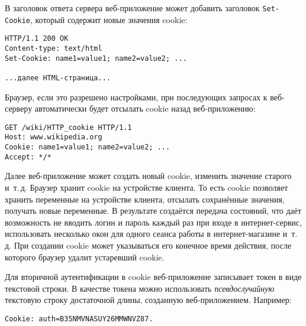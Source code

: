 В заголовок ответа сервера веб-приложение может добавить заголовок \texttt{Set-Cookie}, который содержит новые значения cookie:
\begin{center} \begin{verbatim}
HTTP/1.1 200 OK
Content-type: text/html
Set-Cookie: name1=value1; name2=value2; ...

...далее HTML-страница...
\end{verbatim} \end{center}

Браузер, если это разрешено настройками, при последующих запросах к веб-серверу автоматически будет отсылать cookie назад веб-приложению:
\begin{center} \begin{verbatim}
GET /wiki/HTTP_cookie HTTP/1.1
Host: www.wikipedia.org
Cookie: name1=value1; name2=value2; ...
Accept: */*
\end{verbatim} \end{center}

Далее веб-приложение может создать новый cookie, изменить значение старого и~т.\,д. Браузер хранит cookie на устройстве клиента. То есть cookie позволяет хранить переменные на устройстве клиента, отсылать сохранённые значения, получать новые переменные. В результате создаётся передача состояний, что даёт возможность не вводить логин и пароль каждый раз при входе в интернет-сервис, использовать несколько окон для одного сеанса работы в интернет-магазине и~т.\,д. При создании cookie может указываться его конечное время действия, после которого браузер удалит устаревший cookie.

Для вторичной аутентификации в cookie веб-приложение записывает токен в виде текстовой строки. В качестве токена можно использовать \emph{псевдослучайную} текстовую строку достаточной длины, созданную веб-приложением. Например:
\begin{center} \begin{verbatim}
Cookie: auth=B35NMVNASUY26MMWNVZ87.
\end{verbatim} \end{center}

